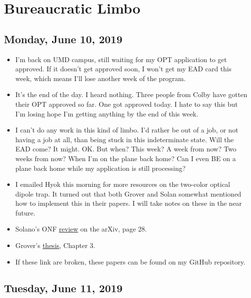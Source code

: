 \documentclass{book}
\theoremstyle{definition}
\begin{document}
\chapter{Bureaucratic Limbo}

\section*{Monday, June 10, 2019}

\begin{itemize}
	\item I'm back on UMD campus, still waiting for my OPT application to get approved. If it doesn't get approved soon, I won't get my EAD card this week, which means I'll lose another week of the program.
	
	
	\item It's the end of the day. I heard nothing. Three people from Colby have gotten their OPT approved so far. One got approved today. I hate to say this but I'm losing hope I'm getting anything by the end of this week. 
	
	
	\item I can't do any work in this kind of limbo. I'd rather be out of a job, or not having a job at all, than being stuck in this indeterminate state. Will the EAD come? It might. OK. But when? This week? A week from now? Two weeks from now? When I'm on the plane back home? Can I even BE on a plane back home while my application is still processing?

	
	\item I emailed Hyok this morning for more resources on the two-color optical dipole trap. It turned out that both Grover and Solan somewhat mentioned how to implement this in their papers. I will take notes on these in the near future. 
	
	\item Solano's ONF \href{https://arxiv.org/pdf/1703.10533.pdf}{review} on the arXiv, page 28. 
	
	\item Grover's \href{https://drum.lib.umd.edu/handle/1903/16638}{thesis}, Chapter 3. 
	
	\item If these link are broken, these papers can be found on my GitHub repository. 

\end{itemize}



\section*{Tuesday, June 11, 2019}
\end{document}
